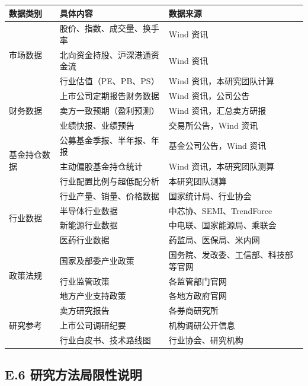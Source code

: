 \begin{exhibitbox}[表 E-3：主要数据来源清单]
\centering
\small
\renewcommand{\arraystretch}{1.15}
\begin{tabularx}{\textwidth}{@{}l X l@{}}
\toprule
\textbf{数据类别} & \textbf{具体内容} & \textbf{数据来源} \\
\midrule
\multirow{3}{*}{市场数据} & 股价、指数、成交量、换手率 & Wind 资讯 \\
& 北向资金持股、沪深港通资金流 & Wind 资讯 \\
& 行业估值（PE、PB、PS） & Wind 资讯，本研究团队计算 \\
\cmidrule(lr){2-3}
\multirow{3}{*}{财务数据} & 上市公司定期报告财务数据 & Wind 资讯，公司公告 \\
& 卖方一致预期（盈利预测） & Wind 资讯，汇总卖方研报 \\
& 业绩快报、业绩预告 & 交易所公告，Wind 资讯 \\
\cmidrule(lr){2-3}
\multirow{3}{*}{基金持仓数据} & 公募基金季报、半年报、年报 & 基金公司公告，Wind 资讯 \\
& 主动偏股基金持仓统计 & Wind 资讯，本研究团队测算 \\
& 行业配置比例与超低配分析 & 本研究团队测算 \\
\cmidrule(lr){2-3}
\multirow{4}{*}{行业数据} & 行业产量、销量、价格数据 & 国家统计局、行业协会 \\
& 半导体行业数据 & 中芯协、SEMI、TrendForce \\
& 新能源行业数据 & 中电联、国家能源局、乘联会 \\
& 医药行业数据 & 药监局、医保局、米内网 \\
\cmidrule(lr){2-3}
\multirow{3}{*}{政策法规} & 国家及部委产业政策 & 国务院、发改委、工信部、科技部等官网 \\
& 行业监管政策 & 各监管部门官网 \\
& 地方产业支持政策 & 各地方政府官网 \\
\cmidrule(lr){2-3}
\multirow{3}{*}{研究参考} & 卖方研究报告 & 各券商研究所 \\
& 上市公司调研纪要 & 机构调研公开信息 \\
& 行业白皮书、技术路线图 & 行业协会、研究机构 \\
\bottomrule
\end{tabularx}
\vspace{0.5em}
\end{exhibitbox}

\subsection{E.6 研究方法局限性说明}

